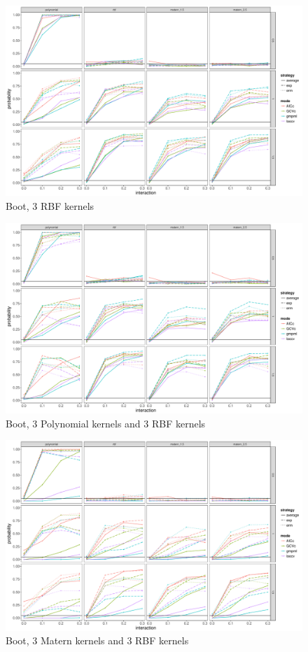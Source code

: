 \documentclass[11pt]{article}
\begin{document}
\begin{figure}
\begin{center}
\includegraphics[width=0.9\columnwidth]{B3} 
\caption{Boot, 3 RBF kernels}
\label{fig:res}
\end{center}
\end{figure}

\begin{figure}
\begin{center}
\includegraphics[width=0.9\columnwidth]{B4} 
\caption{Boot, 3 Polynomial kernels and 3 RBF kernels}
\label{fig:res}
\end{center}
\end{figure}

\begin{figure}
\begin{center}
\includegraphics[width=0.9\columnwidth]{B5} 
\caption{Boot, 3 Matern kernels and 3 RBF kernels}
\label{fig:res}
\end{center}
\end{figure}


\clearpage



\end{document}
